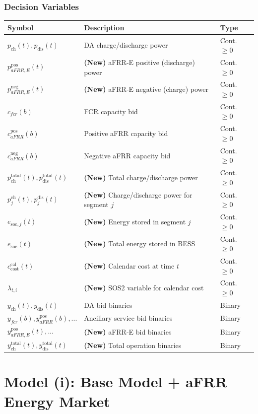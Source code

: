 \documentclass[11pt, a4paper]{article}
\begin{document}
\subsubsection{Decision Variables}
\begin{tabular}{@{}lll}
\toprule
Symbol & Description & Type \\
\midrule
$p_{\mathrm{ch}}(t), p_{\mathrm{dis}}(t)$ & DA charge/discharge power & Cont. $\ge 0$ \\
$p^{\mathrm{pos}}_{aFRR,E}(t)$ & \textbf{(New)} aFRR-E positive (discharge) power & Cont. $\ge 0$ \\
$p^{\mathrm{neg}}_{aFRR,E}(t)$ & \textbf{(New)} aFRR-E negative (charge) power & Cont. $\ge 0$ \\
$c_{fcr}(b)$ & FCR capacity bid & Cont. $\ge 0$ \\
$c^{\mathrm{pos}}_{aFRR}(b)$ & Positive aFRR capacity bid & Cont. $\ge 0$ \\
$c^{\mathrm{neg}}_{aFRR}(b)$ & Negative aFRR capacity bid & Cont. $\ge 0$ \\
$p^{\mathrm{total}}_{\mathrm{ch}}(t), p^{\mathrm{total}}_{\mathrm{dis}}(t)$ & \textbf{(New)} Total charge/discharge power & Cont. $\ge 0$ \\
$p^{\mathrm{ch}}_{j}(t), p^{\mathrm{dis}}_{j}(t)$ & \textbf{(New)} Charge/discharge power for segment $j$ & Cont. $\ge 0$ \\
$e_{\mathrm{soc},j}(t)$ & \textbf{(New)} Energy stored in segment $j$ & Cont. $\ge 0$ \\
$e_{\mathrm{soc}}(t)$ & \textbf{(New)} Total energy stored in BESS & Cont. $\ge 0$ \\
$c^{\mathrm{cal}}_{\mathrm{cost}}(t)$ & \textbf{(New)} Calendar cost at time $t$ & Cont. $\ge 0$ \\
$\lambda_{t,i}$ & \textbf{(New)} SOS2 variable for calendar cost & Cont. $\ge 0$ \\
$y_{\mathrm{ch}}(t), y_{\mathrm{dis}}(t)$ & DA bid binaries & Binary \\
$y_{fcr}(b), y^{\mathrm{pos}}_{aFRR}(b), ...$ & Ancillary service bid binaries & Binary \\
$y^{\mathrm{pos}}_{aFRR,E}(t), ...$ & \textbf{(New)} aFRR-E bid binaries & Binary \\
$y^{\mathrm{total}}_{\mathrm{ch}}(t), y^{\mathrm{total}}_{\mathrm{dis}}(t)$ & \textbf{(New)} Total operation binaries & Binary \\
\bottomrule
\end{tabular}


\section{Model (i): Base Model + aFRR Energy Market}
\end{document}

